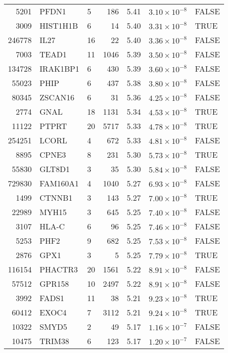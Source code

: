 \begin{table}[ht]
\begin{adjustbox}{totalheight=10in}
\begin{tabular}{rllrrrl}
  5201 & PFDN1 & 5 & 186 & 5.41 & $3.10 \times 10^{-8}$ & FALSE \\ 
  3009 & HIST1H1B & 6 &  14 & 5.40 & $3.31 \times 10^{-8}$ & TRUE \\ 
  246778 & IL27 & 16 &  22 & 5.40 & $3.36 \times 10^{-8}$ & FALSE \\ 
  7003 & TEAD1 & 11 & 1046 & 5.39 & $3.50 \times 10^{-8}$ & FALSE \\ 
  134728 & IRAK1BP1 & 6 & 430 & 5.39 & $3.60 \times 10^{-8}$ & FALSE \\ 
  55023 & PHIP & 6 & 437 & 5.38 & $3.80 \times 10^{-8}$ & FALSE \\ 
  80345 & ZSCAN16 & 6 &  31 & 5.36 & $4.25 \times 10^{-8}$ & FALSE \\ 
  2774 & GNAL & 18 & 1131 & 5.34 & $4.53 \times 10^{-8}$ & TRUE \\ 
  11122 & PTPRT & 20 & 5717 & 5.33 & $4.78 \times 10^{-8}$ & TRUE \\ 
  254251 & LCORL & 4 & 672 & 5.33 & $4.81 \times 10^{-8}$ & FALSE \\ 
  8895 & CPNE3 & 8 & 231 & 5.30 & $5.73 \times 10^{-8}$ & TRUE \\ 
  55830 & GLT8D1 & 3 &  35 & 5.30 & $5.84 \times 10^{-8}$ & FALSE \\ 
  729830 & FAM160A1 & 4 & 1040 & 5.27 & $6.93 \times 10^{-8}$ & FALSE \\ 
  1499 & CTNNB1 & 3 & 143 & 5.27 & $7.00 \times 10^{-8}$ & TRUE \\ 
  22989 & MYH15 & 3 & 645 & 5.25 & $7.40 \times 10^{-8}$ & FALSE \\ 
  3107 & HLA-C & 6 &  96 & 5.25 & $7.46 \times 10^{-8}$ & FALSE \\ 
  5253 & PHF2 & 9 & 682 & 5.25 & $7.53 \times 10^{-8}$ & FALSE \\ 
  2876 & GPX1 & 3 &   5 & 5.25 & $7.79 \times 10^{-8}$ & TRUE \\ 
  116154 & PHACTR3 & 20 & 1561 & 5.22 & $8.91 \times 10^{-8}$ & FALSE \\ 
  57512 & GPR158 & 10 & 2497 & 5.22 & $8.91 \times 10^{-8}$ & FALSE \\ 
  3992 & FADS1 & 11 &  38 & 5.21 & $9.23 \times 10^{-8}$ & TRUE \\ 
  60412 & EXOC4 & 7 & 3112 & 5.21 & $9.24 \times 10^{-8}$ & TRUE \\ 
  10322 & SMYD5 & 2 &  49 & 5.17 & $1.16 \times 10^{-7}$ & FALSE \\ 
  10475 & TRIM38 & 6 & 123 & 5.17 & $1.20 \times 10^{-7}$ & FALSE \\ 

\end{tabular}
\end{adjustbox}
\end{table}
